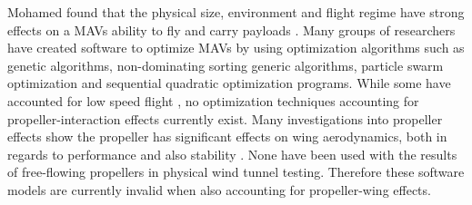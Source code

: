 Mohamed found that the physical size, environment and flight regime have strong effects on a MAVs ability to fly and carry payloads \cite{Mohamed2014}. Many groups of researchers have created software to optimize MAVs by using optimization algorithms such as genetic algorithms, non-dominating sorting generic algorithms, particle swarm optimization and sequential quadratic optimization programs. While some have accounted for low speed flight \cite{Vijayanandh2019} \cite{Bronz2009} \cite{HASSANALIAN2019}, no optimization techniques accounting for propeller-interaction effects currently exist. Many investigations into propeller effects show the propeller has significant effects on wing aerodynamics, both in regards to performance and also stability \cite{Parga2007} \cite{Jana2020}. None have been used with the results of free-flowing propellers in physical wind tunnel testing. Therefore these software models are currently invalid when also accounting for propeller-wing effects.


